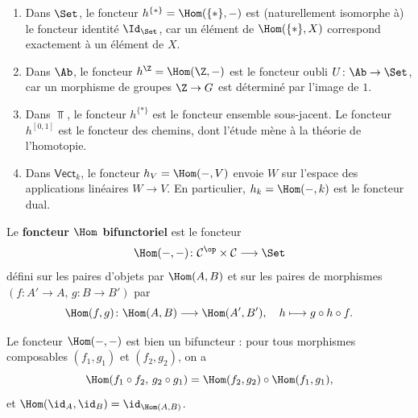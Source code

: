 \begin{exemple}\label{ex:hom-foncteurs}
\begin{enumerate}[label=(\roman*)]
\item Dans $\Set$, le foncteur $h^{\{*\}} = \Hom(\{*\}, -)$ est
    (naturellement isomorphe à) le foncteur identité $\Id_{\Set}$,
    car un élément de $\Hom(\{*\}, X)$ correspond exactement
    à un élément de $X$.

\item Dans $\Ab$, le foncteur $h^{\Z} = \Hom(\Z, -)$ est le
    foncteur oubli $U \colon \Ab \to \Set$,
    car un morphisme de groupes $\Z \to G$ est déterminé par l'image de $1$.

\item Dans $\Top$, le foncteur $h^{\{*\}}$ est le foncteur
    ensemble sous-jacent. Le foncteur $h^{[0,1]}$ est le foncteur
    des chemins, dont l'étude mène à la
    théorie de l'homotopie.

\item Dans $\mathsf{Vect}_k$, le foncteur $h_V = \Hom(-, V)$
    envoie $W$ sur l'espace des applications linéaires $W \to V$.
    En particulier, $h_{k} = \Hom(-, k)$ est le foncteur dual.
\end{enumerate}
\end{exemple}

\begin{definition}\label{def:hom-bifuncteur}
Le \textbf{foncteur $\Hom$ bifunctoriel} est le foncteur
\[
    \Hom(-,-) \colon \mathcal{C}^{\op} \times \mathcal{C} \longrightarrow \Set
\]
défini sur les paires d'objets par $\Hom(A, B)$ et sur les paires de morphismes
$(f \colon A' \to A,\, g \colon B \to B')$ par
\[
    \Hom(f, g) \colon \Hom(A, B) \longrightarrow \Hom(A', B'), \quad
    h \longmapsto g \circ h \circ f.
\]
\end{definition}

\begin{proposition}\label{prop:hom-bifuncteur-fonctorialite}
Le foncteur $\Hom(-,-)$ est bien un bifuncteur : pour tous morphismes
composables $(f_1, g_1)$ et $(f_2, g_2)$, on a
\[
    \Hom(f_1 \circ f_2,\, g_2 \circ g_1) = \Hom(f_2, g_2) \circ \Hom(f_1, g_1),
\]
et $\Hom(\id_A, \id_B) = \id_{\Hom(A,B)}$.
\end{proposition}

